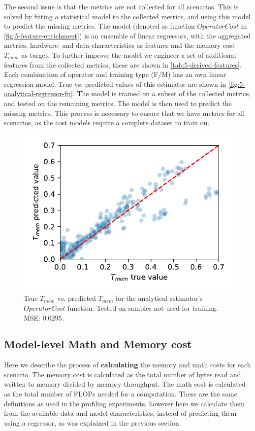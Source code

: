 The second issue is that the metrics are not collected for all scenarios. This is solved by fitting a statistical model to the collected metrics, and using this model to predict the missing metrics. The model (denoted as function $OperatorCost$ in \autoref{fig:5-feature-enrichment}) is an ensemble of linear regressors, with the aggregated metrics, hardware- and data-characteristics as features and the memory cost $T_{mem}$ as target. To further improve the model we engineer a set of additional features from the collected metrics, these are shown in \autoref{tab:5-derived-features}. Each combination of operator and training type (F/M) has an own linear regression model. True vs. predicted values of this estimator are shown in \autoref{fig:5-analytical-regressor-fit}. The model is trained on a subset of the collected metrics, and tested on the remaining metrics. The model is then used to predict the missing metrics. This process is necessary to ensure that we have metrics for all scenarios, as the cost models require a complete dataset to train on.

\begin{figure}[ht]
    \centering
    \includegraphics[width=0.5\linewidth]{chapters/05_cost_estimation/figures/analytical-regressor-fit.pdf}
    \caption[Analytical estimator memory cost prediction vs. true values]{True $T_{mem}$ vs. predicted $T_{mem}$ for the analytical estimator's $OperatorCost$ function. Tested on samples not used for training. MSE: $0.0295$.}
    \label{fig:5-analytical-regressor-fit}
\end{figure}

\subsection{Model-level Math and Memory cost}
\label{subsec:5-model-level-cost}
Here we describe the process of \textbf{calculating} the memory and math costs for each scenario. The memory cost is calculated as the total number of bytes read and written to memory divided by memory throughput. The math cost is calculated as the total number of FLOPs needed for a computation. These are the same definitions as used in the profiling experiments, however here we calculate them from the available data and model characteristics, instead of predicting them using a regressor, as was explained in the previous section.

